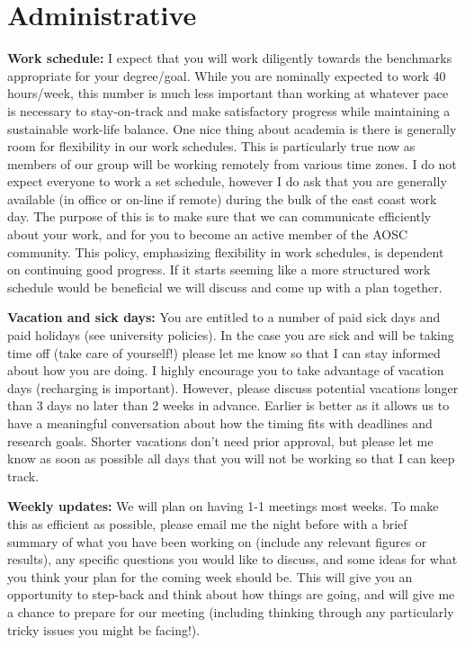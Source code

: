 \documentclass{classassignments}
\begin{document}
\section{Administrative}
\textbf{Work schedule:} I expect that you will work diligently towards the benchmarks appropriate for your degree/goal. While you are nominally expected to work 40 hours/week, this number is much less important than working at whatever pace is necessary to stay-on-track and make satisfactory progress while maintaining a sustainable work-life balance. One nice thing about academia is there is generally room for flexibility in our work schedules. This is particularly true now as members of our group will be working remotely from various time zones. I do not expect everyone to work a set schedule, however I do ask that you are generally available (in office or on-line if remote) during the bulk of the east coast work day. The purpose of this is to make sure that we can communicate efficiently about your work, and for you to become an active member of the AOSC community. This policy, emphasizing flexibility in work schedules, is dependent on continuing good progress. If it starts seeming like a more structured work schedule would be beneficial we will discuss and come up with a plan together.\bigskip

\textbf{Vacation and sick days:} You are entitled to a number of paid sick days and paid holidays (see university policies). In the case you are sick and will be taking time off (take care of yourself!) please let me know so that I can stay informed about how you are doing. I highly encourage you to take advantage of vacation days (recharging is important). However, please discuss potential vacations longer than 3 days no later than 2 weeks in advance. Earlier is better as it allows us to have a meaningful conversation about how the timing fits with deadlines and research goals. Shorter vacations don't need prior approval, but please let me know as soon as possible all days that you will not be working so that I can keep track.\bigskip

\textbf{Weekly updates:} We will plan on having 1-1 meetings most weeks. To make this as efficient as possible, please email me the night before with a brief summary of what you have been working on (include any relevant figures or results), any specific questions you would like to discuss, and some ideas for what you think your plan for the coming week should be. This will give you an opportunity to step-back and think about how things are going, and will give me a chance to prepare for our meeting (including thinking through any particularly tricky issues you might be facing!). \bigskip
\end{document}
